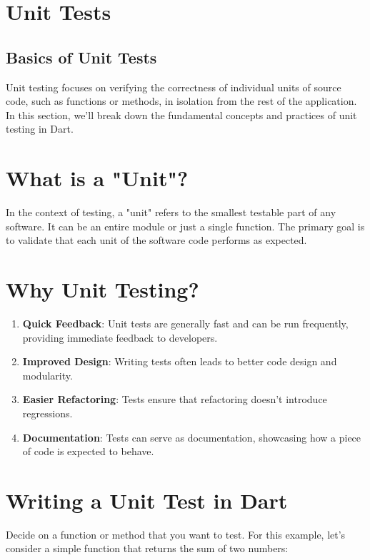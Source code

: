 \section{Unit Tests}
\subsection{Basics of Unit Tests}
Unit testing focuses on verifying the correctness of individual units of source code, such as functions or methods, in isolation from the rest of the application. 
In this section, we'll break down the fundamental concepts and practices of unit testing in Dart.

\section*{What is a "Unit"?}
In the context of testing, a "unit" refers to the smallest testable part of any software. 
It can be an entire module or just a single function. 
The primary goal is to validate that each unit of the software code performs as expected.

\section*{Why Unit Testing?}

\begin{enumerate}
 \item \textbf{Quick Feedback}: Unit tests are generally fast and can be run frequently, providing immediate feedback to developers.
 \item \textbf{Improved Design}: Writing tests often leads to better code design and modularity.
 \item \textbf{Easier Refactoring}: Tests ensure that refactoring doesn't introduce regressions.
 \item \textbf{Documentation}: Tests can serve as documentation, showcasing how a piece of code is expected to behave.
\end{enumerate}

\section*{Writing a Unit Test in Dart}

Decide on a function or method that you want to test. For this example, let's consider a simple function that returns the sum of two numbers:

